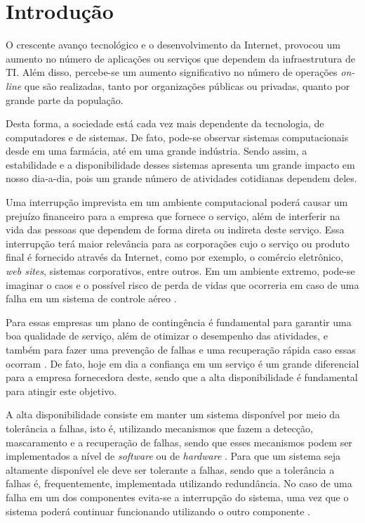 \chapter{Introdução}
O crescente avanço tecnológico e o desenvolvimento da Internet, provocou um aumento no número de aplicações ou serviços que dependem da 
infraestrutura de \ac{TI}. Além disso, percebe-se um aumento significativo no número de operações \textit{on-line} que são realizadas, 
tanto por organizações públicas ou privadas, quanto por grande parte da população.

Desta forma, a sociedade está cada vez mais dependente da tecnologia, de computadores e de sistemas. De fato, pode-se observar 
sistemas computacionais desde em uma farmácia, até em uma grande indústria. Sendo assim, a estabilidade e a disponibilidade desses 
sistemas apresenta um grande impacto em nosso dia-a-dia, pois um grande número de atividades cotidianas dependem deles.

Uma interrupção imprevista em um ambiente computacional poderá causar um prejuízo financeiro para a empresa que fornece o serviço, 
além de interferir na vida das pessoas que dependem de forma direta ou indireta deste serviço. 
Essa interrupção terá maior relevância para as corporações cujo o serviço ou produto final é fornecido através da Internet, 
como por exemplo, o comércio eletrônico, \textit{web sites}, sistemas corporativos, entre outros. 
Em um ambiente extremo, pode-se imaginar o caos e o possível risco de perda de vidas que ocorreria em caso de uma falha 
em um sistema de controle aéreo \cite{costa2009}.

Para essas empresas um plano de contingência é fundamental para garantir uma boa qualidade de serviço, além de otimizar o desempenho 
das atividades, e também para fazer uma prevenção de falhas e uma recuperação rápida caso essas ocorram \cite{costa2009}.
De fato, hoje em dia a confiança em um serviço é um grande diferencial para a empresa fornecedora deste, 
sendo que a alta disponibilidade é fundamental para atingir este objetivo.

A alta disponibilidade consiste em manter um sistema disponível por meio da tolerância a falhas, isto é, utilizando mecanismos que fazem a 
detecção, mascaramento e a recuperação de falhas, sendo que esses mecanismos podem ser implementados a nível de \textit{software} ou de 
\textit{hardware} \cite{reis2009}. Para que um sistema seja altamente disponível ele deve ser tolerante a falhas, sendo que a tolerância
a falhas é, frequentemente, implementada utilizando redundância. No caso de uma falha em um dos componentes evita-se a interrupção do sistema,
uma vez que o sistema poderá continuar funcionando utilizando o outro componente \cite{batista2007}.

